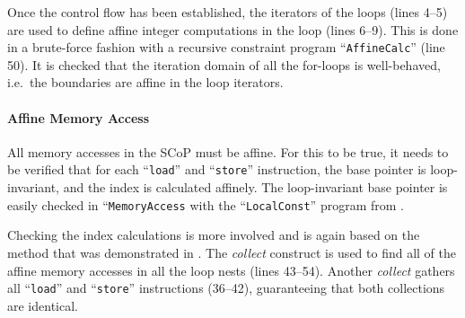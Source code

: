     Once the control flow has been established, the iterators of the loops
    (lines 4--5) are used to define affine integer computations in the loop
    (lines 6--9).
    This is done in a brute-force fashion with a recursive constraint program
    ``{\tt AffineCalc}'' (line 50).
    It is checked that the iteration domain of all the for-loops is
    well-behaved, i.e.\ the boundaries are affine in the loop iterators.

    \paragraph*{Affine Memory Access}
    All memory accesses in the SCoP must be affine.
    For this to be true, it needs to be verified that for each ``{\tt load}''
    and ``{\tt store}'' instruction, the base pointer is loop-invariant, and the
    index is calculated affinely.
    The loop-invariant base pointer is easily checked in ``{\tt MemoryAccess}
    with the ``{\tt LocalConst}'' program from .

    Checking the index calculations is more involved and is again based on the
    method that was demonstrated in .
    The {\it collect} construct is used to find all of the affine memory
    accesses in all the loop nests (lines 43--54).
    Another {\it collect} gathers all ``{\tt load}'' and ``{\tt store}''
    instructions (36--42), guaranteeing that both collections are identical.

